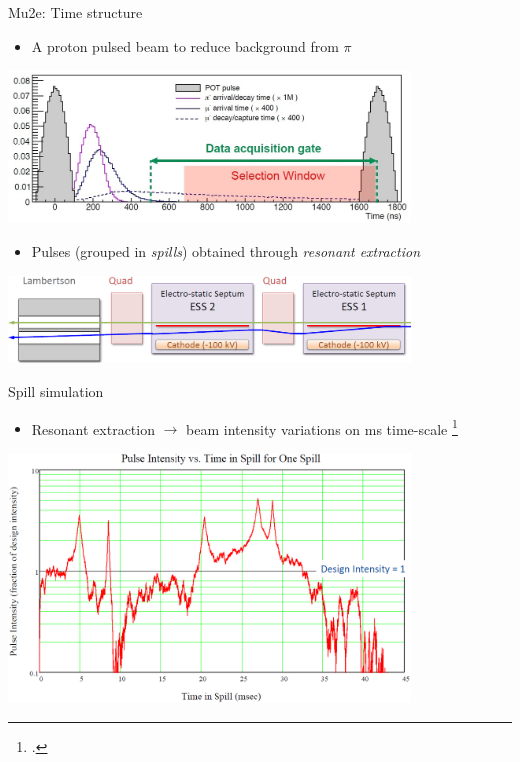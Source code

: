 \documentclass[10pt]{beamer}
\begin{document}
%
\begin{frame}{Mu2e: Time structure}
\centering
\begin{itemize}
\item A proton pulsed beam to reduce background from $\pi$
\end{itemize}
\includegraphics[width=0.8\textwidth]{mu2e_event}
\begin{itemize}
\item Pulses (grouped in \textit{spills}) obtained through \textit{resonant extraction}
\end{itemize}
\includegraphics[width=0.8\textwidth]{Extraction}
\end{frame}

%
\begin{frame}{Spill simulation}
\begin{itemize}
\item Resonant extraction $\rightarrow$ beam intensity variations on ms time-scale \footcite{SpillSim}\\
\end{itemize}
\begin{center}
\includegraphics[width=0.8\textwidth]{POT_sim}
\end{center}
\end{frame}
\end{document}

